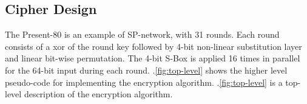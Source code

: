 \documentclass[preprint]{transcrypto}
\begin{document}
\subsection{Cipher Design}
The Present-80 is an example of SP-network, with 31 rounds. Each round consists of a xor of the round key followed by 4-bit non-linear substitution layer and linear bit-wise permutation. The 4-bit S-Box is applied 16 times in parallel for the 64-bit input during each round. \figurename .{\ref{fig:top-level} } shows the higher level pseudo-code for implementing the encryption algorithm. \figurename .{\ref{fig:top-level} } is a top-level description of the encryption algorithm.

\end{document}
